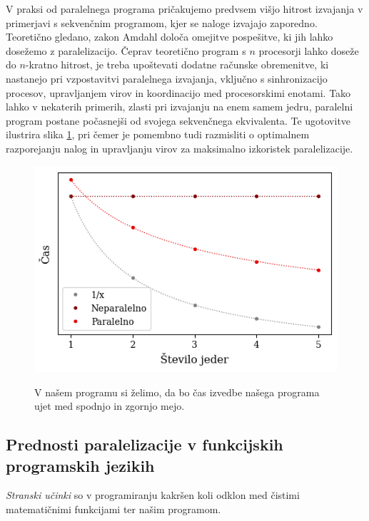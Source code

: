 \documentclass[mat1, tisk]{fmfdelo}
\begin{document}
V praksi od paralelnega programa pričakujemo predvsem višjo hitrost izvajanja v primerjavi s sekvenčnim programom,
kjer se naloge izvajajo zaporedno. Teoretično gledano, zakon Amdahl \cite{amdahl1967} določa omejitve pospešitve,
ki jih lahko dosežemo z paralelizacijo. Čeprav teoretično program s $n$ procesorji lahko doseže do $n$-kratno hitrost,
je treba upoštevati dodatne računske obremenitve, ki nastanejo pri vzpostavitvi paralelnega izvajanja, vključno s
sinhronizacijo procesov, upravljanjem virov in koordinacijo med procesorskimi enotami. Tako lahko v nekaterih primerih,
zlasti pri izvajanju na enem samem jedru, paralelni program postane počasnejši od svojega sekvenčnega ekvivalenta.
Te ugotovitve ilustrira slika \ref{fig:cilj-casovne-zahtevnosti-paralelizacije}, pri čemer je pomembno tudi razmisliti o
optimalnem razporejanju nalog in upravljanju virov za maksimalno izkoristek paralelizacije.

\begin{figure}[h!]
  \centering
  \caption{V našem programu si želimo, da bo čas izvedbe našega programa ujet med spodnjo in zgornjo mejo.}
  \includegraphics[width=13cm]{slike/cilj-casovne-zahtevnosti-paralelizacije.png}
  \label{fig:cilj-casovne-zahtevnosti-paralelizacije}
\end{figure}

\subsection{Prednosti paralelizacije v funkcijskih programskih jezikih}

\emph{Stranski učinki} so v programiranju kakršen koli odklon med čistimi matematičnimi funkcijami ter našim programom.
\end{document}
